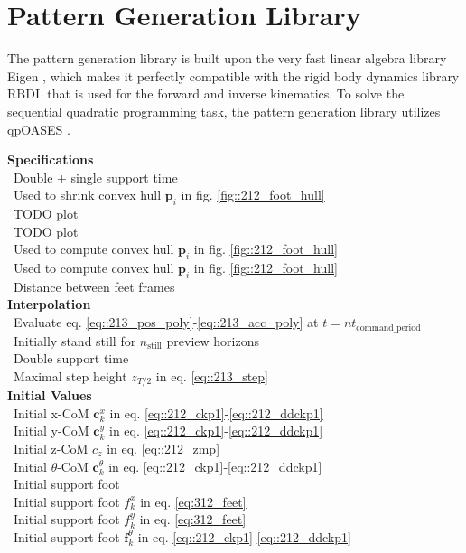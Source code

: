 \FloatBarrier
\section{Pattern Generation Library}
\label{sec::32_pg}
The pattern generation library is built upon the very fast linear algebra library Eigen \cite{eigenweb}, which makes it perfectly compatible with the rigid body dynamics library RBDL \cite{felis2017rbdl} that is used for the forward and inverse kinematics. To solve the sequential quadratic programming task, the pattern generation library utilizes qpOASES \cite{ferreau2014qpoases}. 
\cite{googletest} %
\\
\begin{minipage}[t]{1.\textwidth}
	\begin{minipage}{0.5\textwidth}
		\scriptsize{
			\hfill \textbf{Specifications}\\
			\mbox{}~\hfill Double + single support time\\
			\mbox{}~\hfill Used to shrink convex hull $\bm{p}_i$ in fig.  \ref{fig::212_foot_hull}\\
			\mbox{}~\hfill TODO plot\\
			\mbox{}~\hfill TODO plot\\
			\mbox{}~\hfill Used to compute convex hull $\bm{p}_i$ in fig.  \ref{fig::212_foot_hull}\\
			\mbox{}~\hfill Used to compute convex hull $\bm{p}_i$ in fig.  \ref{fig::212_foot_hull}\\
			\mbox{}~\hfill Distance between feet frames\\
			
			\hfill \textbf{Interpolation}\\
			\mbox{}~\hfill Evaluate eq. \ref{eq::213_pos_poly}-\ref{eq::213_acc_poly} at $t=nt_\text{command\_period}$\\
			\mbox{}~\hfill Initially stand still for $n_\text{still}$ preview horizons\\
			\mbox{}~\hfill Double support time\\
			\mbox{}~\hfill Maximal step height $z_{T/2}$ in eq. \ref{eq::213_step}\\
			
			\hfill \textbf{Initial Values}\\
			\mbox{}~\hfill Initial x-CoM $\bm{c}_k^x$ in eq. \ref{eq::212_ckp1}-\ref{eq::212_ddckp1}\\
			\mbox{}~\hfill Initial y-CoM $\bm{c}_k^y$ in eq. \ref{eq::212_ckp1}-\ref{eq::212_ddckp1}\\
			\mbox{}~\hfill Initial z-CoM $c_z$ in eq. \ref{eq::212_zmp}\\
			\mbox{}~\hfill Initial $\theta$-CoM $\bm{c}_k^\theta$ in eq. \ref{eq::212_ckp1}-\ref{eq::212_ddckp1}\\
			\mbox{}~\hfill Initial support foot\\
			\mbox{}~\hfill Initial support foot $f_k^x$ in eq. \ref{eq:312_feet}\\
			\mbox{}~\hfill Initial support foot $f_k^y$ in eq. \ref{eq:312_feet}\\
			\mbox{}~\hfill Initial support foot $\bm{f}_k^\theta$ in eq. \ref{eq::212_ckp1}-\ref{eq::212_ddckp1}\\
			
}
\end{minipage}
\end{minipage}
